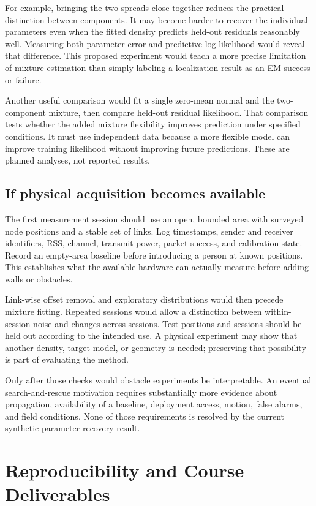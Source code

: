 \documentclass[conference,letterpaper]{IEEEtran}
\begin{document}
For example, bringing the two spreads close together reduces the practical distinction between components. It may become harder to recover the individual parameters even when the fitted density predicts held-out residuals reasonably well. Measuring both parameter error and predictive log likelihood would reveal that difference. This proposed experiment would teach a more precise limitation of mixture estimation than simply labeling a localization result as an EM success or failure.

Another useful comparison would fit a single zero-mean normal and the two-component mixture, then compare held-out residual likelihood. That comparison tests whether the added mixture flexibility improves prediction under specified conditions. It must use independent data because a more flexible model can improve training likelihood without improving future predictions. These are planned analyses, not reported results.

\subsection{If physical acquisition becomes available}
The first measurement session should use an open, bounded area with surveyed node positions and a stable set of links. Log timestamps, sender and receiver identifiers, RSS, channel, transmit power, packet success, and calibration state. Record an empty-area baseline before introducing a person at known positions. This establishes what the available hardware can actually measure before adding walls or obstacles.

Link-wise offset removal and exploratory distributions would then precede mixture fitting. Repeated sessions would allow a distinction between within-session noise and changes across sessions. Test positions and sessions should be held out according to the intended use. A physical experiment may show that another density, target model, or geometry is needed; preserving that possibility is part of evaluating the method.

Only after those checks would obstacle experiments be interpretable. An eventual search-and-rescue motivation requires substantially more evidence about propagation, availability of a baseline, deployment access, motion, false alarms, and field conditions. None of those requirements is resolved by the current synthetic parameter-recovery result.

\section{Reproducibility and Course Deliverables}
\end{document}
